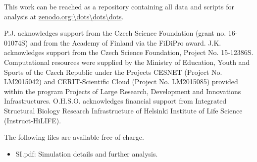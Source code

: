 \documentclass[journal=jpcbfk,manuscript=article]{achemso}
\begin{document}
This work can be reached as a repository containing all data and scripts for analysis at \url{zenodo.org:\dots\dots\dots}.


\begin{acknowledgement}
P.J. acknowledges support from the Czech Science Foundation (grant no. 16-01074S) 
and from the Academy of Finland via the FiDiPro award.
J.K. acknowledges support from the Czech Science Foundation, Project No. 15-12386S.
Computational resources were supplied by the Ministry of Education, Youth and Sports
of the Czech Republic under the Projects CESNET (Project No. LM2015042) and CERIT-Scientific
Cloud (Project No. LM2015085) provided within the program Projects of Large Research,
Development and Innovations Infrastructures.
O.H.S.O. acknowledges financial support from
Integrated Structural Biology Research Infrastructure of
Helsinki Institute of Life Science (Instruct-HiLIFE).
\end{acknowledgement}

\begin{suppinfo}


The following files are available free of charge.
\begin{itemize}
  \item SI.pdf: Simulation details and further analysis.
\end{itemize}

\end{suppinfo}



\end{document}
